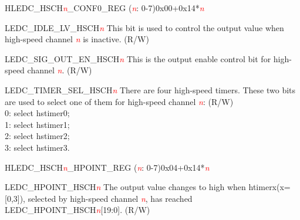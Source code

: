 \begin{register}{H}{LEDC\_HSCH\textcolor{red}{\it{n}}\_CONF0\_REG (\textcolor{red}{\it{n}}: 0-7)}{0x00+0x14*\textcolor{red}{\it{n}}}\label{regdesc:LEDCHSCHnCONF0REG}
%
%
%
%
\regnewline%
\begin{regdesc}\begin{reglist}
\item [LEDC\_IDLE\_LV\_HSCH\textcolor{red}{\it{n}}]This bit is used to control the output value when high-speed channel \textcolor{red}{\it{n}} is inactive. (R/W)
\item [LEDC\_SIG\_OUT\_EN\_HSCH\textcolor{red}{\it{n}}]This is the output enable control bit for high-speed channel \textcolor{red}{\it{n}}. (R/W)
\item [LEDC\_TIMER\_SEL\_HSCH\textcolor{red}{\it{n}}]There are four high-speed timers. These two bits are used to select one of them for high-speed channel \textcolor{red}{\it{n}}:  (R/W) \\0: select hstimer0; \\1: select hstimer1;  \\2: select hstimer2; \\3: select hstimer3.
\end{reglist}\end{regdesc}
\end{register}


\begin{register}{H}{LEDC\_HSCH\textcolor{red}{\it{n}}\_HPOINT\_REG (\textcolor{red}{\it{n}}: 0-7)}{0x04+0x14*\textcolor{red}{\it{n}}}\label{regdesc:LEDCHSCHnHPOINTREG}
%
%
\regnewline%
\begin{regdesc}\begin{reglist}
\item [LEDC\_HPOINT\_HSCH\textcolor{red}{\it{n}}]The output value changes to high when htimerx(x=[0,3]), selected by high-speed channel \textcolor{red}{\it{n}}, has reached LEDC\_HPOINT\_HSCH\textcolor{red}{\it{n}}[19:0]. (R/W)
\end{reglist}\end{regdesc}
\end{register}


